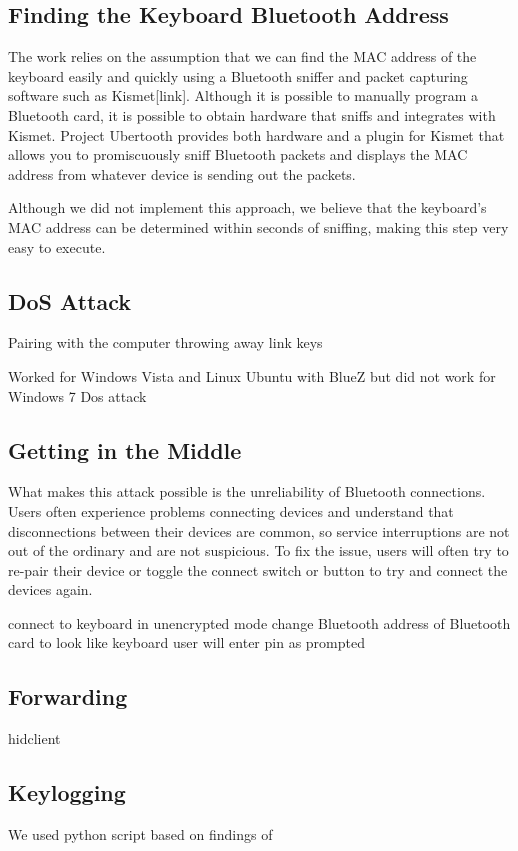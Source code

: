 \documentclass{acm_proc_article-sp}
\begin{document}
\subsection{Finding the Keyboard Bluetooth Address}
The work relies on the assumption that we can find the MAC address of the keyboard easily and quickly using a Bluetooth sniffer and packet capturing software such as Kismet[link]. Although it is possible to manually program a Bluetooth card, it is possible to obtain hardware that sniffs and integrates with Kismet. Project Ubertooth provides both hardware and a plugin for Kismet that allows you to promiscuously sniff Bluetooth packets and displays the MAC address from whatever device is sending out the packets. 

Although we did not implement this approach, we believe that the keyboard's MAC address can be determined within seconds of sniffing, making this step very easy to execute. 
\cite{hak5}

\subsection{DoS Attack}
Pairing with the computer
throwing away link keys 

Worked for Windows Vista and Linux Ubuntu with BlueZ but did not work for Windows 7 \cite{cuthbertbluetooth}
Dos attack\cite{bandyopadhyay2010information}

\subsection{Getting in the Middle}
What makes this attack possible is the unreliability of Bluetooth connections. Users often experience problems connecting devices and understand that disconnections between their devices are common, so service interruptions are not out of the ordinary and are not suspicious. To fix the issue, users will often try to re-pair their device or toggle the connect switch or button to try and connect the devices again. 

connect to keyboard in unencrypted mode
change Bluetooth address of Bluetooth card to look like keyboard 
user will enter pin as prompted

\subsection{Forwarding}
hidclient \cite{hidclient}
\subsection{Keylogging}
We used python script based on findings of \cite{chopper}
\end{document}

